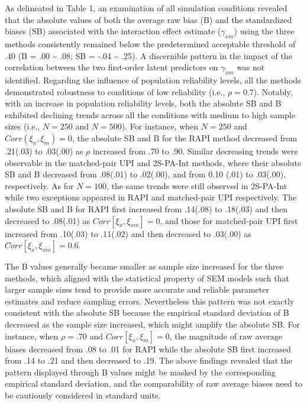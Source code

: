\documentclass[
  man]{apa7}
\begin{document}
As delineated in Table 1, an examination of all simulation conditions revealed that the absolute values of both the average raw bias (B) and the standardized biases (SB) associated with the interaction effect estimate (\(\gamma_{xm}\)) using the three methods consistently remained below the predetermined acceptable threshold of .40 (B = .00 \textasciitilde{} .08; SB = -.04 \textasciitilde{} .25). A discernible pattern in the impact of the correlation between the two first-order latent predictors on \(\gamma_{xm}\) was not identified. Regarding the influence of population reliability levels, all the methods demonstrated robustness to conditions of low reliability (i.e., \(\rho = 0.7\)). Notably, with an increase in population reliability levels, both the absolute SB and B exhibited declining trends across all the conditions with medium to high sample sizes (i.e., \(\textit{N} = 250\) and \(\textit{N} = 500\)). For instance, when \(\textit{N} = 250\) and \(Corr(\xi_{x}, \xi_{m}) = 0\), the absolute SB and B for the RAPI method decreased from .21(.03) to .03(.00) as \(\rho\) increased from .70 to .90. Similar decreasing trends were observable in the matched-pair UPI and 2S-PA-Int methods, where their absolute SB and B decreased from .08(.01) to .02(.00), and from 0.10 (.01) to .03(.00), respectively. As for \(\textit{N} = 100\), the same trends were still observed in 2S-PA-Int while two exceptions appeared in RAPI and matched-pair UPI respectively. The absolute SB and B for RAPI first increased from .14(.08) to .18(.03) and then decreased to .08(.01) as \(Corr[\xi_{x}, \xi_{xm}] = 0\), and those for matched-pair UPI first increased from .10(.03) to .11(.02) and then decreased to .03(.00) as \(Corr[\xi_{x}, \xi_{xm}] = 0.6\).

The B values generally became smaller as sample size increased for the three methods, which aligned with the statistical property of SEM models such that larger sample sizes tend to provide more accurate and reliable parameter estimates and reduce sampling errors. Nevertheless this pattern was not exactly consistent with the absolute SB because the empirical standard deviation of B decreased as the sample size increased, which might amplify the absolute SB. For instance, when \(\rho = .70\) and \(Corr[\xi_{x}, \xi_{m}] = 0\), the magnitude of raw average biases decreased from .08 to .01 for RAPI while the absolute SB first increased from .14 to .21 and then decreased to .19. The above findings revealed that the pattern displayed through B values might be masked by the corresponding empirical standard deviation, and the comparability of raw average biases need to be cautiously considered in standard units.
\end{document}
